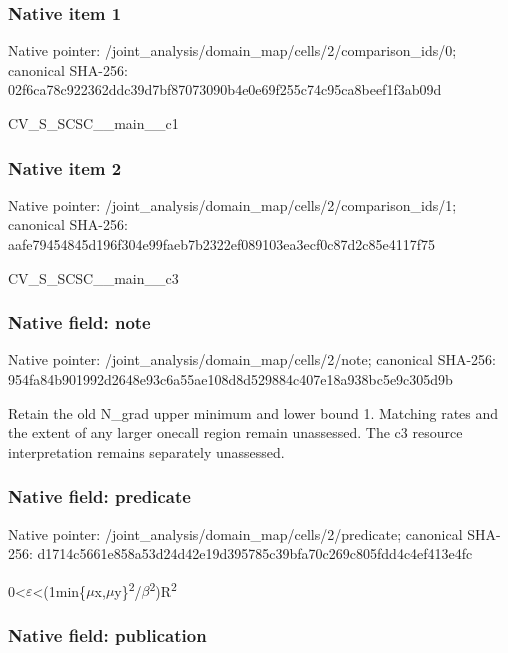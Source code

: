 \documentclass[10pt,a4paper]{article}
\begin{document}
\subsubsection{Native item 1}


Native pointer: /joint\_analysis/domain\_m\allowbreak{}ap/cells/2/comparison\_id\allowbreak{}s/0; canonical SHA-256: 02f6ca78c922362ddc39d7bf\allowbreak{}87073090b4e0e69f255c74c9\allowbreak{}5ca8beef1f3ab09d


CV\_S\_SCSC\_\_main\_\_c1


\subsubsection{Native item 2}


Native pointer: /joint\_analysis/domain\_m\allowbreak{}ap/cells/2/comparison\_id\allowbreak{}s/1; canonical SHA-256: aafe79454845d196f304e99f\allowbreak{}aeb7b2322ef089103ea3ecf0\allowbreak{}c87d2c85e4117f75


CV\_S\_SCSC\_\_main\_\_c3


\subsubsection{Native field: note}


Native pointer: /joint\_analysis/domain\_map/cells/2/note; canonical SHA-256: 954fa84b901992d2648e93c6\allowbreak{}a55ae108d8d529884c407e18\allowbreak{}a938bc5e9c305d9b


Retain the old N\_grad upper minimum and lower bound 1. Matching rates and the extent of any larger onecall region remain unassessed. The c3 resource interpretation remains separately unassessed.


\subsubsection{Native field: predicate}


Native pointer: /joint\_analysis/domain\_m\allowbreak{}ap/cells/2/predicate; canonical SHA-256: d1714c5661e858a53d24d42e\allowbreak{}19d395785c39bfa70c269c80\allowbreak{}5fdd4c4ef413e4fc


0<\ensuremath{\varepsilon}<(1min\{\ensuremath{\mu}x,\ensuremath{\mu}y\}\textsuperscript{2}/\ensuremath{\beta}\textsuperscript{2})R\textsuperscript{2}


\subsubsection{Native field: publication}
\end{document}
